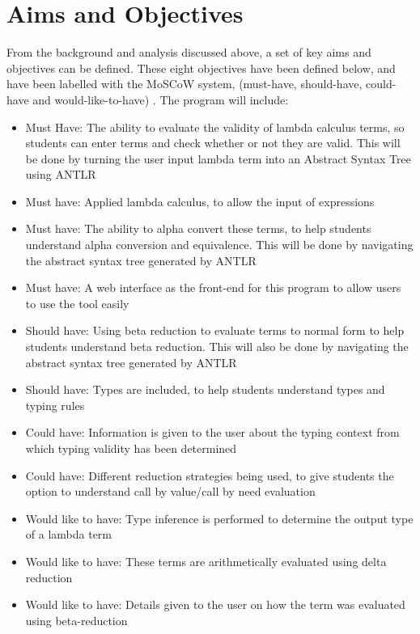 \documentclass[a4paper,11pt]{report}
\begin{document}
\chapter{Aims and Objectives}

From the background and analysis discussed above, a set of key aims and objectives can be defined. These eight objectives have been defined below, and have been labelled with the MoSCoW system, (must-have, should-have, could-have and would-like-to-have) \cite{Agile2014}.
The program will include:

\begin{itemize}
	\item Must Have: The ability to evaluate the validity of lambda calculus terms, so students can enter terms and check whether or not they are valid. This will be done by turning the user input lambda term into an Abstract Syntax Tree using ANTLR
	\item Must have: Applied lambda calculus, to allow the input of expressions
	\item Must have: The ability to alpha convert these terms, to help students understand alpha conversion and equivalence. This will be done by navigating the abstract syntax tree generated by ANTLR
	\item Must have: A web interface as the front-end for this program to allow users to use the tool easily
	\item Should have: Using beta reduction to evaluate terms to normal form to help students understand beta reduction. This will also be done by navigating the abstract syntax tree generated by ANTLR
	\item Should have: Types are included, to help students understand types and typing rules
	\item Could have: Information is given to the user about the typing context from which typing validity has been determined
	\item Could have: Different reduction strategies being used, to give students the option to understand call by value/call by need evaluation
	\item Would like to have: Type inference is performed to determine the output type of a lambda term
	\item Would like to have: These terms are arithmetically evaluated using delta reduction
	\item Would like to have: Details given to the user on how the term was evaluated using beta-reduction 
\end{itemize}
\end{document}
